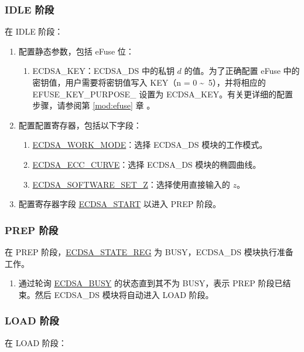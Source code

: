 \documentclass[main\_\_CN.tex]{subfiles}
\begin{document}
\subsubsection{IDLE 阶段}
在 IDLE 阶段：
\begin{enumerate}
	\item 配置静态参数，包括 eFuse 位：
	      \begin{enumerate}
		      \item ECDSA\_KEY：ECDSA\_DS 中的私钥 $d$ 的值。为了正确配置 eFuse 中的密钥值，用户需要将密钥值写入 KEY（n = 0 \textasciitilde \ 5），并将相应的 EFUSE\_KEY\_PURPOSE\_ 设置为 ECDSA\_KEY。有关更详细的配置步骤，请参阅第 \ref{mod:efuse} 章 \textit{}。
	      \end{enumerate}
	\item 配置配置寄存器，包括以下字段：
	      \begin{enumerate}
		      \item \hyperref[fielddesc:ECDSAWORKMODE]{ECDSA\_WORK\_MODE}：选择 ECDSA\_DS 模块的工作模式。
		      \item \hyperref[fielddesc:ECDSAECCCURVE]{ECDSA\_ECC\_CURVE}：选择 ECDSA\_DS 模块的椭圆曲线。
		      \item \hyperref[fielddesc:ECDSASOFTWARESETZ]{ECDSA\_SOFTWARE\_SET\_Z}：选择使用直接输入的 $z$。
	      \end{enumerate}
	\item 配置寄存器字段 \hyperref[fielddesc:ECDSASTART]{ECDSA\_START} 以进入 PREP 阶段。
\end{enumerate}

\subsubsection{PREP 阶段}

在 PREP 阶段，\hyperref[regdesc:ECDSASTATEREG]{ECDSA\_STATE\_REG} 为 BUSY，ECDSA\_DS 模块执行准备工作。

\begin{enumerate}
    \item 通过轮询 \hyperref[fielddesc:ECDSABUSY]{ECDSA\_BUSY} 的状态直到其不为 BUSY，表示 PREP 阶段已结束。然后 ECDSA\_DS 模块将自动进入 LOAD 阶段。
\end{enumerate}

\subsubsection{LOAD 阶段}
在 LOAD 阶段：
\end{document}
